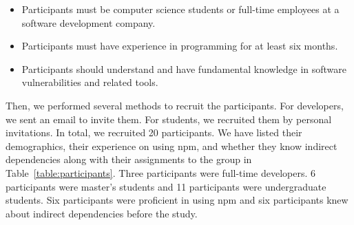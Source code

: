 \documentclass[conference]{IEEEtran}
\begin{document}
	\begin{itemize}
		\item Participants must be computer science students or full-time employees at a software development company.
		\item Participants must have experience in programming for at least six months.
		\item Participants should understand and have fundamental knowledge in software vulnerabilities and related tools.
	\end{itemize}
	
	Then, we performed several methods to recruit the participants. For developers, we sent an email to invite them. For students, we recruited them by personal invitations. In total, we recruited 20 participants. We have listed their demographics, their experience on using npm, and whether they know indirect dependencies along with their assignments to the group in Table~\ref{table:participants}. Three participants were full-time developers. 6 participants were master's students and 11 participants were undergraduate students. Six participants were proficient in using npm and six participants knew about indirect dependencies before the study.
	
\end{document}

